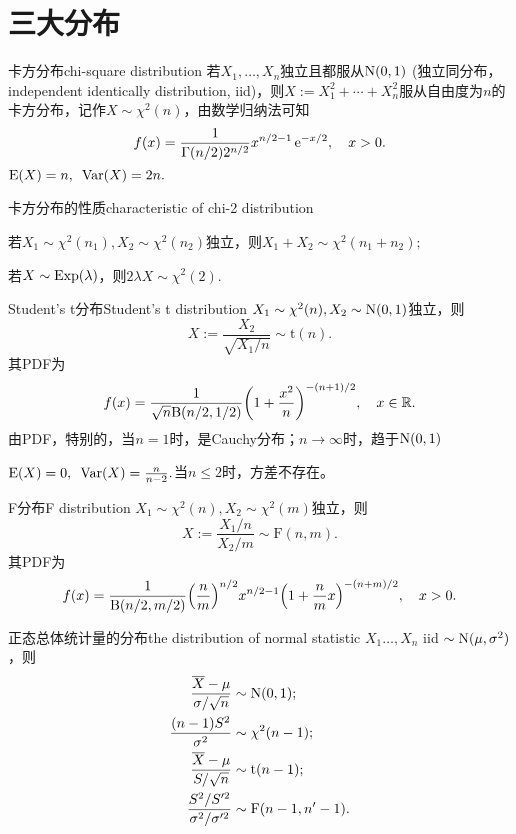 \section{三大分布}\label{subsec:chi2, t, F}
\begin{definition}{卡方分布}{chi-square distribution}
	若$X_1,\ldots,X_n$独立且都服从$\operatorname{N}(0,1)$ (独立同分布，independent identically distribution, iid)，则$X:=X_1^2+\cdots+X_n^2$服从自由度为$n$的卡方分布，记作$X\sim\chi^2(n)$，由数学归纳法可知
	\begin{align}
		f(x)=\frac1{\Gamma(n/2)2^{n/2}}x^{n/2-1}\mathop{}\!\mathrm{e}^{-x/2},\quad x>0.
	\end{align}
	$\operatorname{E}(X)=n,\enspace\operatorname{Var}(X)=2n.$
\end{definition}
\begin{theorem}{卡方分布的性质}{characteristic of chi-2 distribution}
	\begin{compactenum}
		\item 若$X_1\sim\chi^2(n_1),X_2\sim\chi^2(n_2)$独立，则$X_1+X_2\sim\chi^2(n_1+n_2);$
		\item 若$X\sim\operatorname{Exp}(\lambda)$，则$2\lambda X\sim\chi^2(2).$
	\end{compactenum}
\end{theorem}
\begin{definition}{Student's t分布}{Student's t distribution}
	$X_1\sim\chi^2(n),X_2\sim\operatorname{N}(0,1)$独立，则
	\[
		X:=\frac{X_2}{\sqrt{X_1/n}}\sim\mathrm t(n).
	\]
	其PDF为
	\begin{align}
		f(x)=\frac1{\sqrt n\mathrm B(n/2,1/2)}\biggl(1+\frac{x^2}n\biggr)^{-(n+1)/2},\quad x\in\mathbb R.
	\end{align}
	由PDF，特别的，当$n=1$时，是Cauchy分布；$n\to\infty$时，趋于$\operatorname{N}(0,1)$
	
	$\operatorname{E}(X)=0,\enspace\operatorname{Var}(X)=\frac{n}{n-2}.$当$n\leqslant 2$时，方差不存在。
\end{definition}
\begin{definition}{F分布}{F distribution}
	$X_1\sim\chi^2(n),X_2\sim\chi^2(m)$独立，则 
	\[
		X:=\frac{X_1/n}{X_2/m}\sim\mathrm F(n,m).
	\]
	其PDF为
	\begin{align}
		f(x)=\frac1{\mathrm B(n/2,m/2)}\Bigl(\frac nm\Bigr)^{n/2}x^{n/2-1}\Bigl(1+\frac nmx\Bigr)^{-(n+m)/2},\quad x>0.
	\end{align}
\end{definition}
\begin{theorem}{正态总体统计量的分布}{the distribution of normal statistic}
	$X_1\ldots,X_n$ iid $\sim\operatorname{N}(\mu,\sigma^2)$，则
	\begin{align}
		\label{sample-N}
		\frac{\overline{X}-\mu}{\sigma/\sqrt n}&\sim\operatorname{N}(0,1);\\
		\label{sample-chi2}
		\frac{(n-1)S^2}{\sigma^2}&\sim\chi^2(n-1);\\
		\label{sample-t}
		\frac{\overline{X}-\mu}{S/\sqrt n}&\sim\mathrm t(n-1);\\
		\label{2sample-F}
		\frac{S^2/S'^2}{\sigma^2/\sigma'^2}&\sim\mathrm F(n-1,n'-1).
	\end{align}
\end{theorem}
